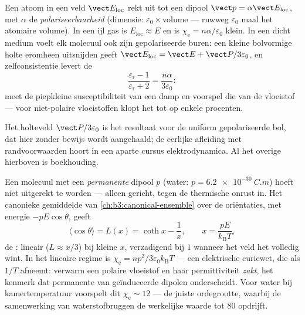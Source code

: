 \begin{proposition}\label{prop:b3:electromagnetism-in-matter:mossotti}
Een atoom in een veld $\vect E_{\text{loc}}$ rekt uit tot een dipool
$\vect p = \alpha\vect E_{\text{loc}}$, met $\alpha$ de
\emph{polariseerbaarheid} (dimensie: $\varepsilon_0\times$volume ---
ruwweg $\varepsilon_0$ maal het atomaire volume). In een ijl gas is
$E_{\text{loc}} \approx E$ en is $\chi_{\text{e}} =
n\alpha/\varepsilon_0$ klein. In een dicht medium voelt elk molecuul ook
zijn gepolariseerde buren: een kleine bolvormige holte eromheen uitsnijden
geeft $\vect E_{\text{loc}} = \vect E + \vect
P/3\varepsilon_0$, en zelfconsistentie levert de
\emph{}
\[
\frac{\varepsilon_{\text{r}} - 1}{\varepsilon_{\text{r}} + 2}
= \frac{n\alpha}{3\varepsilon_0} :
\]
meet de piepkleine susceptibiliteit van een damp en voorspel die van de vloeistof ---
voor niet-polaire vloeistoffen klopt het tot op enkele procenten.
\end{proposition}
\admitted

\begin{remark}
Het holteveld $\vect P/3\varepsilon_0$ is het resultaat voor de uniform
gepolariseerde bol, dat hier zonder bewijs wordt aangehaald; de eerlijke
afleiding met randvoorwaarden hoort in een aparte cursus elektrodynamica. Al het
overige hierboven is boekhouding.
\end{remark}

\begin{proposition}\label{prop:b3:electromagnetism-in-matter:langevin}
Een molecuul met een \emph{permanente} dipool $p$ (water:
$p = \qty{6.2e-30}{C.m}$) hoeft niet uitgerekt te worden --- alleen gericht,
tegen de thermische onrust in. Het canonieke gemiddelde van
\cref{ch:b3:canonical-ensemble} over de oriëntaties, met energie
$-pE\cos\theta$, geeft
\[
\langle\cos\theta\rangle = L(x) = \coth x - \frac1x ,
\qquad x = \frac{pE}{k_{\text{B}}T} ,
\]
de \emph{}: lineair ($L \approx x/3$) bij kleine $x$,
verzadigend bij $1$ wanneer het veld het volledig wint. In het lineaire regime is
$\chi_{\text{e}} = np^2/3\varepsilon_0k_{\text{B}}T$ --- een elektrische
curiewet, die als $1/T$ afneemt: verwarm een polaire vloeistof en haar permittiviteit
\emph{zakt}, het kenmerk dat permanente van geïnduceerde dipolen
onderscheidt. Voor water bij kamertemperatuur voorspelt dit
$\chi_{\text{e}} \sim 12$ --- de juiste ordegrootte, waarbij de samenwerking van
waterstofbruggen de werkelijke waarde tot $80$ opdrijft.
\end{proposition}

